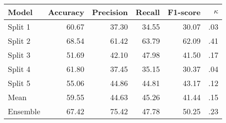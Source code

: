 \begin{tabular}{lrrrrr}
    \toprule
    Model & Accuracy & Precision & Recall & F1-score & $\kappa$ \\
    \midrule
    Split 1 & 60.67 & 37.30 & 34.55 & 30.07 & .03 \\
    Split 2 & 68.54 & 61.42 & 63.79 & 62.09 & .41 \\
    Split 3 & 51.69 & 42.10 & 47.98 & 41.50 & .17 \\
    Split 4 & 61.80 & 37.45 & 35.15 & 30.37 & .04 \\ 
    Split 5 & 55.06 & 44.86 & 44.81 & 43.17 & .12 \\
    \midrule
    Mean & 59.55 & 44.63 & 45.26 & 41.44 & .15 \\
    Ensemble & 67.42 & 75.42 & 47.78 & 50.25 & .23 \\
    \bottomrule
\end{tabular}